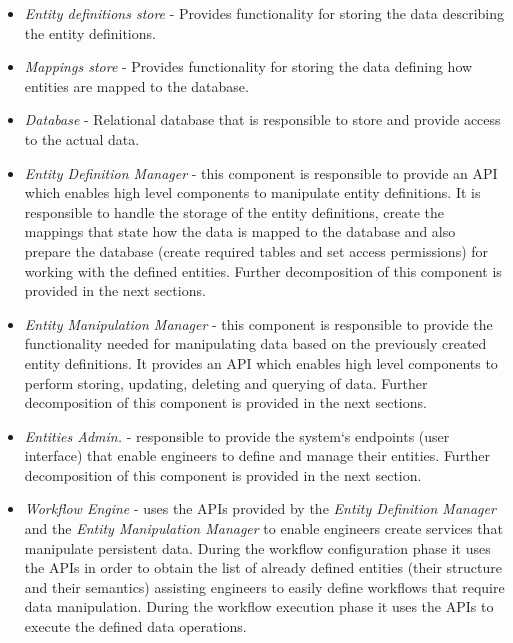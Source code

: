 \begin{itemize}
	
	\item \textit{Entity definitions store} - Provides functionality for storing the data describing the entity definitions. 
		
	\item \textit{Mappings store} - Provides functionality for storing the data defining how entities are mapped to the database.  
	
	\item \textit{Database} - Relational database that is responsible to store and provide access to the actual data.
	
	\item \textit{Entity Definition Manager} - this component is responsible to provide an API which enables high level components to manipulate entity definitions. It is responsible to handle the storage of the entity definitions, create the mappings that state how the data is mapped to the database and also prepare the database (create required tables and set access permissions) for working with the defined entities. Further decomposition of this component is provided in the next sections.
		
	\item \textit{Entity Manipulation Manager} - this component is responsible to provide the functionality needed for manipulating data based on the previously created entity definitions. It provides an API which enables high level components to perform storing, updating, deleting and querying of data. Further decomposition of this component is provided in the next sections.
	
	\item \textit{Entities Admin.} - responsible to provide the system`s endpoints (user interface) that enable engineers to define and manage their entities. Further decomposition of this component is provided in the next section.

	\item \textit{Workflow Engine} - uses the APIs provided by the \textit{Entity Definition Manager} and the \textit{Entity Manipulation Manager} to enable engineers create services that manipulate persistent data. During the workflow configuration phase it uses the APIs in order to obtain the list of already defined entities (their structure and their semantics) assisting engineers to easily define workflows that require data manipulation. During the workflow execution phase it uses the APIs to execute the defined data operations.
\end{itemize}

